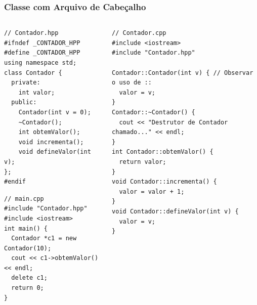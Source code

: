 \documentclass[aspectratio=169]{beamer}
\begin{document}
\begin{frame}[fragile]\frametitle{Classe com Arquivo de Cabeçalho}
\begin{columns}[T]
\begin{column}{0.35\linewidth}
\begin{lstlisting}[basicstyle=\ttfamily\tiny]
// Contador.hpp
#ifndef _CONTADOR_HPP
#define _CONTADOR_HPP
using namespace std;
class Contador {
  private:
    int valor;
  public:
    Contador(int v = 0);
    ~Contador();
    int obtemValor();
    void incrementa();
    void defineValor(int v);
};
#endif
\end{lstlisting}
\begin{lstlisting}[basicstyle=\ttfamily\tiny]
// main.cpp
#include "Contador.hpp"
#include <iostream>
int main() {
  Contador *c1 = new Contador(10);
  cout << c1->obtemValor() << endl;
  delete c1;
  return 0;
}
\end{lstlisting}
\end{column}
\begin{column}{0.65\linewidth}
\begin{lstlisting}[basicstyle=\ttfamily\scriptsize]
// Contador.cpp
#include <iostream>
#include "Contador.hpp"

Contador::Contador(int v) { // Observar o uso de ::
  valor = v;
}
Contador::~Contador() {
  cout << "Destrutor de Contador chamado..." << endl;
}
int Contador::obtemValor() {
  return valor;
}
void Contador::incrementa() {
  valor = valor + 1;
}
void Contador::defineValor(int v) {
  valor = v;
}
\end{lstlisting}
\end{column}
\end{columns}
\end{frame}
\end{document}
